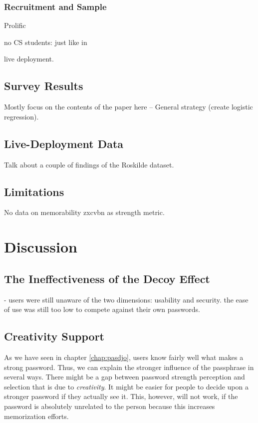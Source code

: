 \subsubsection{Recruitment and Sample}
Prolific

no CS students: just like in \cite{Wash2016UnderstandingPasswordChoices}

live deployment. 

\subsection{Survey Results}
Mostly focus on the contents of the paper here
-- General strategy (create logistic regression).


\subsection{Live-Deployment Data}
Talk about a couple of findings of the Roskilde dataset. 

\subsection{Limitations}
No data on memorability
zxcvbn as strength metric.

\section{Discussion}

\subsection{The Ineffectiveness of the Decoy Effect}
- users were still unaware of the two dimensions: usability and security. the ease of use was still too low to compete against their own passwords. 

\subsection{Creativity Support}
As we have seen in chapter \ref{chap:pasdjo}, users know fairly well what makes a strong password. Thus, we can explain the stronger influence of the passphrase in several ways. There might be a gap between password strength perception and selection that is due to \textit{creativity}. It might be easier for people to decide upon a stronger password if they actually see it. This, however, will not work, if the password is absolutely unrelated to the person because this increases memorization efforts. 

